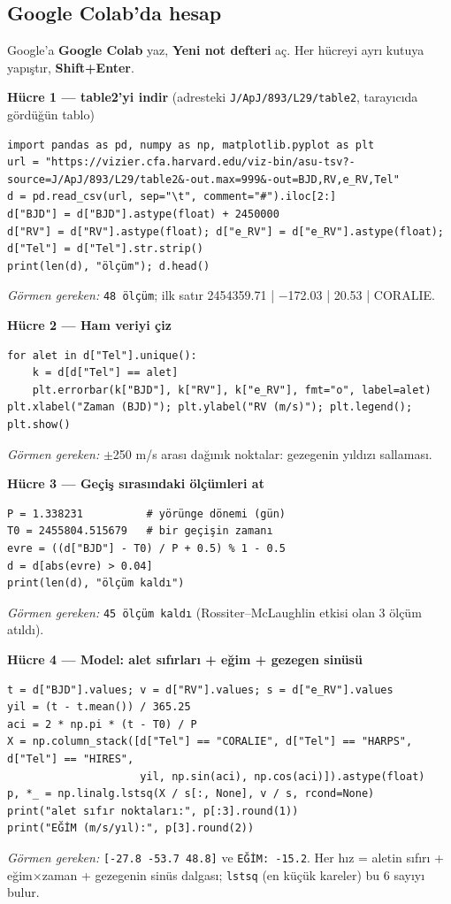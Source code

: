 \documentclass[11pt,a4paper]{article}
\begin{document}
\subsection{Google Colab'da hesap}
Google'a \textbf{Google Colab} yaz, \textbf{Yeni not defteri} aç. Her hücreyi ayrı kutuya yapıştır, \textbf{Shift+Enter}.

\textbf{Hücre 1 — table2'yi indir} (adresteki \texttt{J/ApJ/893/L29/table2}, tarayıcıda gördüğün tablo)
\begin{lstlisting}
import pandas as pd, numpy as np, matplotlib.pyplot as plt
url = "https://vizier.cfa.harvard.edu/viz-bin/asu-tsv?-source=J/ApJ/893/L29/table2&-out.max=999&-out=BJD,RV,e_RV,Tel"
d = pd.read_csv(url, sep="\t", comment="#").iloc[2:]
d["BJD"] = d["BJD"].astype(float) + 2450000
d["RV"] = d["RV"].astype(float); d["e_RV"] = d["e_RV"].astype(float); d["Tel"] = d["Tel"].str.strip()
print(len(d), "ölçüm"); d.head()
\end{lstlisting}
\emph{Görmen gereken:} \texttt{48 ölçüm}; ilk satır 2454359.71 | $-$172.03 | 20.53 | CORALIE.

\textbf{Hücre 2 — Ham veriyi çiz}
\begin{lstlisting}
for alet in d["Tel"].unique():
    k = d[d["Tel"] == alet]
    plt.errorbar(k["BJD"], k["RV"], k["e_RV"], fmt="o", label=alet)
plt.xlabel("Zaman (BJD)"); plt.ylabel("RV (m/s)"); plt.legend(); plt.show()
\end{lstlisting}
\emph{Görmen gereken:} $\pm$250 m/s arası dağınık noktalar: gezegenin yıldızı sallaması.

\textbf{Hücre 3 — Geçiş sırasındaki ölçümleri at}
\begin{lstlisting}
P = 1.338231          # yörünge dönemi (gün)
T0 = 2455804.515679   # bir geçişin zamanı
evre = ((d["BJD"] - T0) / P + 0.5) % 1 - 0.5
d = d[abs(evre) > 0.04]
print(len(d), "ölçüm kaldı")
\end{lstlisting}
\emph{Görmen gereken:} \texttt{45 ölçüm kaldı} (Rossiter--McLaughlin etkisi olan 3 ölçüm atıldı).

\textbf{Hücre 4 — Model: alet sıfırları + eğim + gezegen sinüsü}
\begin{lstlisting}
t = d["BJD"].values; v = d["RV"].values; s = d["e_RV"].values
yil = (t - t.mean()) / 365.25
aci = 2 * np.pi * (t - T0) / P
X = np.column_stack([d["Tel"] == "CORALIE", d["Tel"] == "HARPS", d["Tel"] == "HIRES",
                     yil, np.sin(aci), np.cos(aci)]).astype(float)
p, *_ = np.linalg.lstsq(X / s[:, None], v / s, rcond=None)
print("alet sıfır noktaları:", p[:3].round(1))
print("EĞİM (m/s/yıl):", p[3].round(2))
\end{lstlisting}
\emph{Görmen gereken:} \texttt{[-27.8 -53.7 48.8]} ve \texttt{EĞİM: -15.2}. Her hız = aletin sıfırı + eğim$\times$zaman + gezegenin sinüs dalgası; \texttt{lstsq} (en küçük kareler) bu 6 sayıyı bulur.
\end{document}
